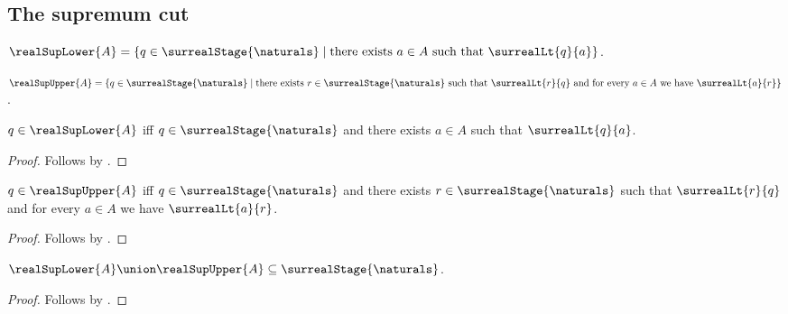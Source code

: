 \subsection{The supremum cut}

\begin{definition}\label{surreal_real_sup_lower}
    $\realSupLower{A}=
        \{q\in\surrealStage{\naturals}\mid
            \text{there exists $a\in A$ such that $\surrealLt{q}{a}$}\}$.
\end{definition}

\begin{definition}\label{surreal_real_sup_upper}
    $\realSupUpper{A}=
        \{q\in\surrealStage{\naturals}\mid
            \text{there exists $r\in\surrealStage{\naturals}$ such that
                $\surrealLt{r}{q}$ and for every $a\in A$ we have
                $\surrealLt{a}{r}$}\}$.
\end{definition}

\begin{proposition}\label{surreal_real_sup_lower_iff}
    $q\in\realSupLower{A}$ iff
        $q\in\surrealStage{\naturals}$ and
        there exists $a\in A$ such that $\surrealLt{q}{a}$.
\end{proposition}
\begin{proof}
    Follows by .
\end{proof}

\begin{proposition}\label{surreal_real_sup_upper_iff}
    $q\in\realSupUpper{A}$ iff
        $q\in\surrealStage{\naturals}$ and
        there exists $r\in\surrealStage{\naturals}$ such that
            $\surrealLt{r}{q}$ and
            for every $a\in A$ we have $\surrealLt{a}{r}$.
\end{proposition}
\begin{proof}
    Follows by .
\end{proof}

\begin{proposition}\label{surreal_real_sup_bounds_finite_stage}
    $\realSupLower{A}\union\realSupUpper{A}
        \subseteq\surrealStage{\naturals}$.
\end{proposition}
\begin{proof}
    Follows by
        .
\end{proof}

